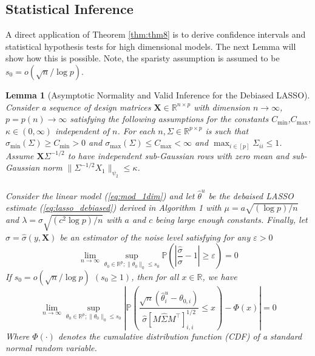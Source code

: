 \documentclass{article}
\newtheorem{lemma}[theorem]{Lemma}
\begin{document}
\subsection{Statistical Inference}
\label{sec:2.3}
A direct application of Theorem \ref{thm:thm8} is to derive confidence intervals and statistical hypothesis tests for high dimensional models. The next Lemma will show how this is possible. Note, the sparisty assumption is assumed to be $s_0 = o(\sqrt{n}/\log p)$. 
\begin{lemma}[Asymptotic Normality and Valid Inference for the Debiased LASSO]
\label{lemma:lemma13}
    Consider a sequence of design matrices $\mathbf{X} \in \mathbb{R}^{n\times p}$ with dimension $n \to \infty$, $p = p(n)\to \infty$ satisfying the following assumptions for the constants $C_{\min}$,$C_{\max}$, $\kappa \in (0, \infty)$ independent of $n$. For each $n, \Sigma \in \mathbb{R}^{p\times p}$ is such that $\sigma_{\min}(\Sigma) \ge C_{\min} >0$ and $\sigma_{\max}(\Sigma) \le C_{\max} < \infty$ and $\max_{i\in [p]}\Sigma_{ii} \le 1$. Assume $\mathbf{X} \Sigma^{-1/2}$ to have independent sub-Gaussian rows with zero mean and sub-Gaussian norm $\|\Sigma^{-1/2}X_1\|_{\psi_2} \le \kappa$.
    \\
    \\
    Consider the linear model (\ref{eq:mod_1dim}) and let $\hat{\theta}^u$ be the debaised LASSO estimate (\ref{eq:lasso_debiased}) derived in Algorithm 1 with $\mu = a \sqrt{(\log p)/n}$ and $\lambda = \sigma \sqrt{(c^2 \log p)/n}$ with $a$ and $c$ being large enough constants. Finally, let $\hat{\sigma} = \hat{\sigma}(y,\mathbf{X})$ be an estimator of the noise level satisfying for any $\varepsilon>0$
    \begin{equation}
        \lim_{n \to \infty} \sup_{\theta_0 \in \mathbb{R}^p; \|\theta_0\|_0 \le s_0}\mathbb{P}\left(\left|\frac{\hat{\sigma}}{\sigma} - 1\right| \ge \varepsilon \right) = 0
    \end{equation}
    If $s_0 = o(\sqrt{n}/\log p)$ $(s_0 \ge 1)$, then for all $x \in \mathbb{R}$, we have
    \begin{equation}
        \lim_{n \to \infty} \sup_{\theta_0 \in \mathbb{R}^p; \|\theta_0\|_0 \le s_0}\left|\mathbb{P}\left(\frac{\sqrt{n}(\hat{\theta}^u_i - \theta_{0,i})}{\hat{\sigma} [M \hat{\Sigma}M^{\top}]_{i,i}^{1/2}}  \le x \right)- \Phi(x)\right| = 0
    \end{equation}
    Where $\Phi(\cdot)$ denotes the cumulative distribution function (CDF) of a standard normal random variable.
\end{lemma}
\end{document}
